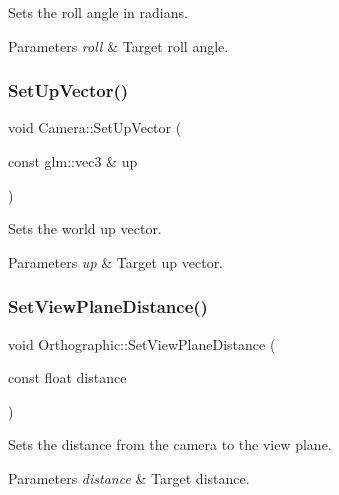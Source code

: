 Sets the roll angle in radians. 
\begin{DoxyParams}{Parameters}
{\em roll} & Target roll angle. \\
\hline
\end{DoxyParams}
\hypertarget{group___cameras_gaa6c9c847b6db5c4d6450fb9b75f26e81}{}\label{group___cameras_gaa6c9c847b6db5c4d6450fb9b75f26e81} 
\subsubsection{\texorpdfstring{Set\+Up\+Vector()}{SetUpVector()}}
{\footnotesize\ttfamily void Camera\+::\+Set\+Up\+Vector (\begin{DoxyParamCaption}\item[{const glm\+::vec3 \&}]{up }\end{DoxyParamCaption})\hspace{0.3cm}{\ttfamily [inline]}}

Sets the world up vector. 
\begin{DoxyParams}{Parameters}
{\em up} & Target up vector. \\
\hline
\end{DoxyParams}
\hypertarget{group___cameras_ga4ad79de10c562075c049f2e580f48f9f}{}\label{group___cameras_ga4ad79de10c562075c049f2e580f48f9f} 
\subsubsection{\texorpdfstring{Set\+View\+Plane\+Distance()}{SetViewPlaneDistance()}\hspace{0.1cm}{\footnotesize\ttfamily [1/2]}}
{\footnotesize\ttfamily void Orthographic\+::\+Set\+View\+Plane\+Distance (\begin{DoxyParamCaption}\item[{const float}]{distance }\end{DoxyParamCaption})\hspace{0.3cm}{\ttfamily [inline]}}

Sets the distance from the camera to the view plane. 
\begin{DoxyParams}{Parameters}
{\em distance} & Target distance. \\
\hline
\end{DoxyParams}
\hypertarget{group___cameras_ga2757f00b8e8e778b6792b0c9e0e4052b}{}\label{group___cameras_ga2757f00b8e8e778b6792b0c9e0e4052b} 
